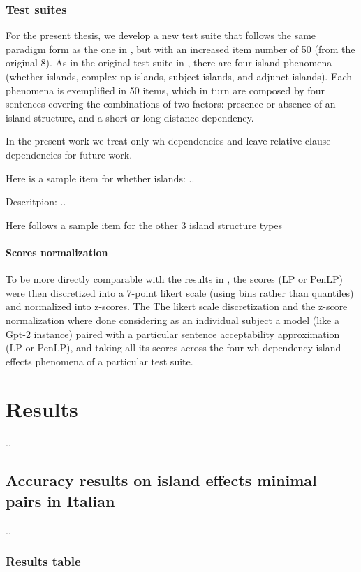 \subsection{Test suites}

For the present thesis, we develop a new test suite that follows the same paradigm form as the one in \citet{sprouse2016experimental}, but with an increased item number of 50 (from the original 8). As in the original test suite in \citet{sprouse2016experimental}, there are four island phenomena (whether islands, complex np islands, subject islands, and adjunct islands). Each phenomena is exemplified in 50 items, which in turn are composed by four sentences covering the combinations of two factors: presence or absence of an island structure, and a short or long-distance dependency.

In the present work we treat only wh-dependencies and leave relative clause dependencies for future work.

Here is a sample item for whether islands:
..

Descritpion: ..

Here follows a sample item for the other 3 island structure types

\subsubsection{Scores normalization}

To be more directly comparable with the results in \citet{sprouse2016experimental}, the scores (LP or PenLP) were then discretized into a 7-point likert scale (using bins rather than quantiles) and normalized into z-scores.
The The likert scale discretization and the z-score normalization where done considering as an individual subject a model (like a Gpt-2 instance) paired with a particular sentence acceptability approximation (LP or PenLP), and taking all its scores across the four wh-dependency island effects phenomena of a particular test suite.

\chapter{Results}
..

\section{Accuracy results on island effects minimal pairs in Italian}
..

\subsection{Results table}

